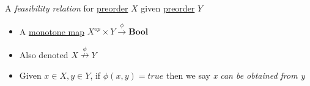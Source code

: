 A \emph{feasibility relation} for \href{doc/1 math/Seven Sketches in Compositionality/Chapter 1: Generative Effects/3 Preorders/1 Preorder}{preorder} $X$ given \href{doc/1 math/Seven Sketches in Compositionality/Chapter 1: Generative Effects/3 Preorders/1 Preorder}{preorder} $Y$

\begin{itemize}
    \item  A \href{doc/1 math/Seven Sketches in Compositionality/Chapter 1: Generative Effects/4 Monotone maps/1 Monotone map}{monotone map} $X^{op}\times Y \xrightarrow{\phi} \mathbf{Bool}$
    \item Also denoted $X \overset{\phi}\nrightarrow Y$
    \item Given $x \in X, y \in Y$, if $\phi(x,y)=true$ then we say \emph{x can be obtained from y}
  \end{itemize}
